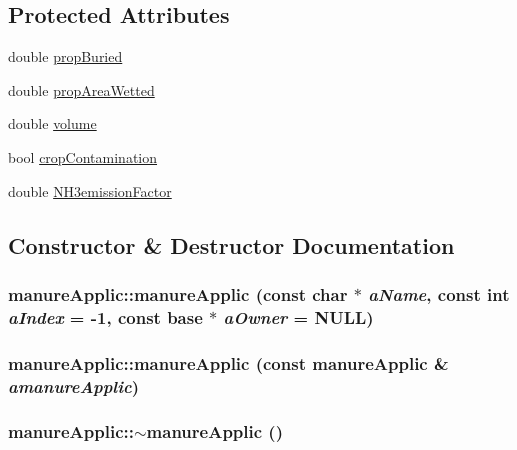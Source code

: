 \subsection*{Protected Attributes}
\begin{DoxyCompactItemize}
\item 
double \hyperlink{classmanure_applic_a7faec14b91030788497ec2a9982b54c7}{propBuried}
\item 
double \hyperlink{classmanure_applic_af2c05dd2d31eef0da241d00c09aa5c52}{propAreaWetted}
\item 
double \hyperlink{classmanure_applic_a9df87be8fbb67199b290d9b586676cfc}{volume}
\item 
bool \hyperlink{classmanure_applic_af42c2a918038bcc0060eb95d6d0ca4d7}{cropContamination}
\item 
double \hyperlink{classmanure_applic_aad84a0ce803d1067899871a4bcf23281}{NH3emissionFactor}
\end{DoxyCompactItemize}


\subsection{Constructor \& Destructor Documentation}
\hypertarget{classmanure_applic_a29f3f549713d4c3b7a97927308f8c34c}{
\subsubsection[{manureApplic}]{\setlength{\rightskip}{0pt plus 5cm}manureApplic::manureApplic (const char $\ast$ {\em aName}, \/  const int {\em aIndex} = {\ttfamily -\/1}, \/  const {\bf base} $\ast$ {\em aOwner} = {\ttfamily NULL})}}
\label{classmanure_applic_a29f3f549713d4c3b7a97927308f8c34c}
\hypertarget{classmanure_applic_a79a516efa331299d3fa91912d157f3ea}{
\subsubsection[{manureApplic}]{\setlength{\rightskip}{0pt plus 5cm}manureApplic::manureApplic (const {\bf manureApplic} \& {\em amanureApplic})}}
\label{classmanure_applic_a79a516efa331299d3fa91912d157f3ea}
\hypertarget{classmanure_applic_a496499e94e520c12aa875b4855c02345}{
\subsubsection[{$\sim$manureApplic}]{\setlength{\rightskip}{0pt plus 5cm}manureApplic::$\sim$manureApplic ()}}
\label{classmanure_applic_a496499e94e520c12aa875b4855c02345}


